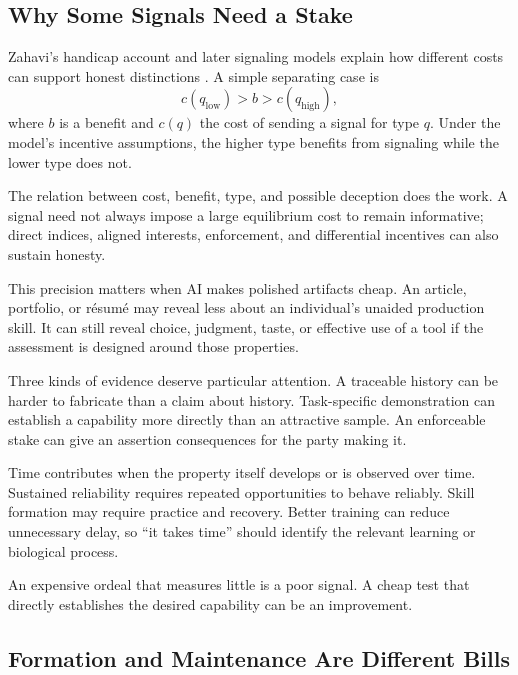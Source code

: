 \subsection{Why Some Signals Need a Stake}

Zahavi's handicap account and later signaling models explain how different costs can support honest distinctions \cite{zahavi1975mate,grafen1990biological}. A simple separating case is
\begin{equation}
 c(q_{\mathrm{low}})>b>c(q_{\mathrm{high}}),
\end{equation}
where $b$ is a benefit and $c(q)$ the cost of sending a signal for type $q$. Under the model's incentive assumptions, the higher type benefits from signaling while the lower type does not.

The relation between cost, benefit, type, and possible deception does the work. A signal need not always impose a large equilibrium cost to remain informative; direct indices, aligned interests, enforcement, and differential incentives can also sustain honesty.

This precision matters when AI makes polished artifacts cheap. An article, portfolio, or résumé may reveal less about an individual's unaided production skill. It can still reveal choice, judgment, taste, or effective use of a tool if the assessment is designed around those properties.

Three kinds of evidence deserve particular attention. A traceable history can be harder to fabricate than a claim about history. Task-specific demonstration can establish a capability more directly than an attractive sample. An enforceable stake can give an assertion consequences for the party making it.

Time contributes when the property itself develops or is observed over time. Sustained reliability requires repeated opportunities to behave reliably. Skill formation may require practice and recovery. Better training can reduce unnecessary delay, so “it takes time” should identify the relevant learning or biological process.

An expensive ordeal that measures little is a poor signal. A cheap test that directly establishes the desired capability can be an improvement.

\subsection{Formation and Maintenance Are Different Bills}


